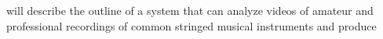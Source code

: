will describe the outline of a system that can analyze videos
of amateur and professional recordings of common stringed musical instruments and
produce
